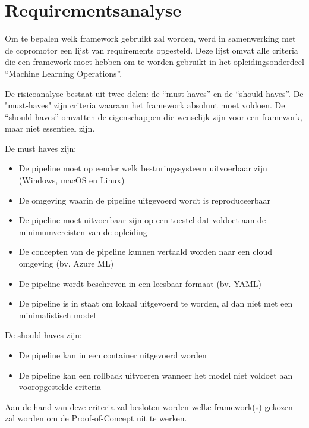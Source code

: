 \section{Requirementsanalyse}

Om te bepalen welk framework gebruikt zal worden, werd in samenwerking met de copromotor een lijst van requirements opgesteld. Deze lijst omvat alle criteria die een framework moet hebben om te worden gebruikt in het opleidingsonderdeel ``Machine Learning Operations''.


De risicoanalyse bestaat uit twee delen: de ``must-haves'' en de ``should-haves''. De "must-haves" zijn criteria waaraan het framework absoluut moet voldoen. De ``should-haves'' omvatten de eigenschappen die wenselijk zijn voor een framework, maar niet essentieel zijn.

De must haves zijn:
\begin{itemize}
    \item De pipeline moet op eender welk besturingssysteem uitvoerbaar zijn (Windows, macOS en Linux)
    \item De omgeving waarin de pipeline uitgevoerd wordt is reproduceerbaar
    \item De pipeline moet uitvoerbaar zijn op een toestel dat voldoet aan de minimumvereisten van de opleiding
    \item De concepten van de pipeline kunnen vertaald worden naar een cloud omgeving (bv. Azure ML)
    \item De pipeline wordt beschreven in een leesbaar formaat (bv. YAML)
    \item De pipeline is in staat om lokaal uitgevoerd te worden, al dan niet met een minimalistisch model
\end{itemize}
De should haves zijn:
\begin{itemize}
    \item De pipeline kan in een container uitgevoerd worden
    \item De pipeline kan een rollback uitvoeren wanneer het model niet voldoet aan vooropgestelde criteria
\end{itemize}

Aan de hand van deze criteria zal besloten worden welke framework(s) gekozen zal worden om de Proof-of-Concept uit te werken.

